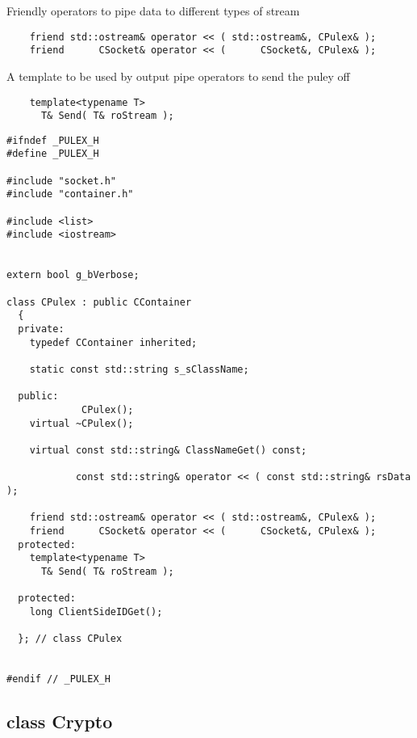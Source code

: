 \documentclass[twoside,a4paper,english,12pt,authoryear,openright]{book}
\begin{document}
Friendly operators to pipe data to different types of stream
\begin{lstlisting}
    friend std::ostream& operator << ( std::ostream&, CPulex& );
    friend      CSocket& operator << (      CSocket&, CPulex& );
\end{lstlisting}

A template to be used by output pipe operators to send the puley off
\begin{lstlisting}
    template<typename T>
      T& Send( T& roStream );
\end{lstlisting}


\begin{lstlisting}
#ifndef _PULEX_H
#define _PULEX_H

#include "socket.h"
#include "container.h"

#include <list>
#include <iostream>


extern bool g_bVerbose;

class CPulex : public CContainer
  {
  private:
    typedef CContainer inherited;

    static const std::string s_sClassName;

  public:
             CPulex();
    virtual ~CPulex();

    virtual const std::string& ClassNameGet() const;

            const std::string& operator << ( const std::string& rsData );

    friend std::ostream& operator << ( std::ostream&, CPulex& );
    friend      CSocket& operator << (      CSocket&, CPulex& );
  protected:
    template<typename T>
      T& Send( T& roStream );

  protected:
    long ClientSideIDGet();

  }; // class CPulex


#endif // _PULEX_H
\end{lstlisting}




\subsection{class Crypto}
\end{document}
